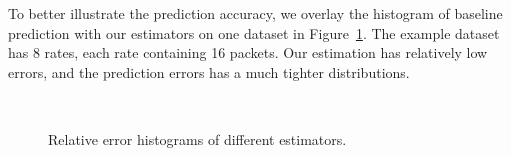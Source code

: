To better illustrate the prediction accuracy, we overlay the histogram of
baseline prediction with our estimators on one dataset in
Figure~\ref{fig:hist}. The example dataset has 8 rates, each rate containing 16
packets. Our estimation has relatively low errors, and the prediction errors
has a much tighter distributions.

\begin{figure}[htpb]
   \centering
   \quad
   \quad
   \\
   \quad
   \quad
   \caption{Relative error histograms of different estimators.}
   \label{fig:hist}
\end{figure}
